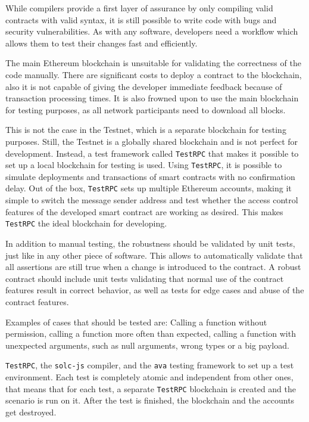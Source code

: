 While compilers provide a first layer of assurance by only compiling valid contracts with valid syntax, it is still possible to write code with bugs and security vulnerabilities. As with any software, developers need a workflow which allows them to test their changes fast and efficiently.

The main Ethereum blockchain is unsuitable for validating the correctness of the code manually. There are significant costs to deploy a contract to the blockchain, also it is not capable of giving the developer immediate feedback because of transaction processing times. It is also frowned upon to use the main blockchain for testing purposes, as all network participants need to download all blocks.

This is not the case in the Testnet, which is a separate blockchain for testing purposes. Still, the Testnet is a globally shared blockchain and is not perfect for development. Instead, a test framework called \texttt{TestRPC} that makes it possible to set up a local blockchain for testing is used. Using \texttt{TestRPC}, it is possible to simulate deployments and transactions of smart contracts with no confirmation delay. Out of the box, \texttt{TestRPC} sets up multiple Ethereum accounts, making it simple to switch the message sender address and test whether the access control features of the developed smart contract are working as desired. This makes \texttt{TestRPC} the ideal blockchain for developing.

In addition to manual testing, the robustness should be validated by unit tests, just like in any other piece of software. This allows to automatically validate that all assertions are still true when a change is introduced to the contract. A robust contract should include unit tests validating that normal use of the contract features result in correct behavior, as well as tests for edge cases and abuse of the contract features.

Examples of cases that should be tested are: Calling a function without permission, calling a function more often than expected, calling a function with unexpected arguments, such as null arguments, wrong types or a big payload.

\texttt{TestRPC}, the \texttt{solc-js} compiler, and the \texttt{ava} testing framework to set up a test environment. Each test is completely atomic and independent from other ones, that means that for each test, a separate \texttt{TestRPC} blockchain is created and the scenario is run on it. After the test is finished, the blockchain and the accounts get destroyed.

